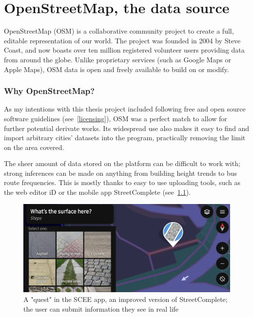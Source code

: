 \chapter{OpenStreetMap, the data source} %

OpenStreetMap (OSM) is a collaborative community project to create a full, editable representation of our world. The project was founded in 2004 by Steve Coast, and now boasts over ten million registered volunteer users providing data from around the globe. Unlike proprietary services (such as Google Maps or Apple Maps), OSM data is open and freely available to build on or modify.\cite{osmHistory}

\subsection{Why OpenStreetMap?}

As my intentions with this thesis project included following free and open source software guidelines (see~\ref{licensing}), OSM was a perfect match to allow for further potential derivate works. Its widespread use also makes it easy to find and import arbitrary cities' datasets into the program, practically removing the limit on the area covered.

The sheer amount of data stored on the platform can be difficult to work with; strong inferences can be made on anything from building height trends to bus route frequencies. This is mostly thanks to easy to use uploading tools, such as the web editor iD or the mobile app StreetComplete (see~\ref{scee}).

\begin{figure}[h]
    \centering
    \includegraphics[width=140mm, keepaspectratio]{images/scee_example.jpg}
    \caption{A "quest" in the SCEE app, an improved version of StreetComplete; the user can submit information they see in real life \label{scee}}
\end{figure}

